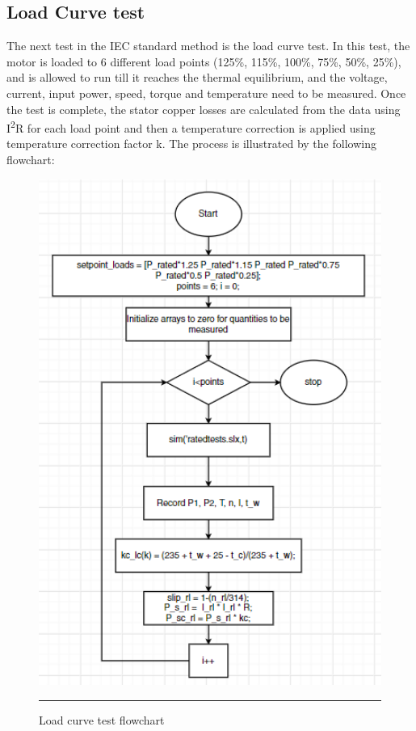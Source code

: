 \subsection{Load Curve test}
The next test in the IEC standard method is the load curve test. In this test, the motor is loaded  to 6 different load points (125\%, 115\%, 100\%, 75\%, 50\%, 25\%), and is allowed to run till it reaches the thermal equilibrium, and the voltage, current, input power, speed, torque and temperature need to be measured.
Once the test is complete, the stator copper losses are calculated from the data using I\textsuperscript{2}R for each load point and then a temperature correction is applied using temperature correction factor k. The process is illustrated by the following flowchart:
\begin{figure}[htbp]
	\centering
		\includegraphics[width = 4.5in]{./Figures/MS/fig43.png}
		\rule{35em}{0.5pt}
	\caption{Load curve test flowchart}
	\label{fig:Load curve test flowchart} 
\end{figure}
\newpage

